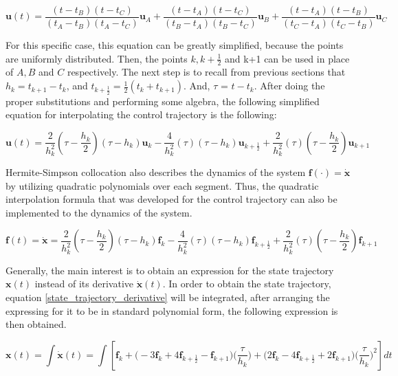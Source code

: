 \documentclass{thesisreport}
\begin{document}
\begin{equation}
\bm{u}(t) = \frac{(t-t_B)(t-t_C)}{(t_A-t_B)(t_A-t_C)}\bm{u}_A + 
\frac{(t-t_A)(t-t_C)}{(t_B-t_A)(t_B-t_C)}\bm{u}_B + 
\frac{(t-t_A)(t-t_B)}{(t_C-t_A)(t_C-t_B)}\bm{u}_C
\end{equation}

For this specific case, this equation can be greatly simplified, because the points are uniformly distributed.
Then, the points $k, k+\frac{1}{2}$ and k+1 can be used in place of $A,B$ and $C$ respectively. The next step is to recall from previous sections that $h_k = t_{k+1}-t_k$, and  $t_{k + \frac{1}{2}}=\frac{1}{2}(t_k + t_{k+1})$. And, $\tau$ = $t-t_k$. After doing the proper substitutions and performing some algebra, the following simplified equation for interpolating the control trajectory is the following:

\begin{equation}
	\bm{u}(t) = \frac{2}{h_k^2} (\tau - \frac{h_k}{2})(\tau - h_k)\bm{u}_k - \frac{4}{h_k^2}(\tau)(\tau - h_k)\bm{u}_{k+\frac{1}{2}} + \frac{2}{h_k^2}(\tau)(\tau-\frac{h_k}{2})\bm{u}_{k+1} 
\end{equation}

Hermite-Simpson collocation also describes the dynamics of the system $\bm{f}(\cdot)=\dot{\bm{x}}$ by utilizing quadratic polynomials over each segment. Thus, the quadratic interpolation formula that was developed for the control trajectory can also be implemented to the dynamics of the system.

\begin{equation}\label{state_trajectory_derivative}
	\bm{f}(t) = \dot{\bm{x}} = \frac{2}{h_k^2} (\tau - \frac{h_k}{2})(\tau - h_k)\bm{f}_k - \frac{4}{h_k^2}(\tau)(\tau - h_k)\bm{f}_{k+\frac{1}{2}} + \frac{2}{h_k^2}(\tau)(\tau-\frac{h_k}{2})\bm{f}_{k+1} 
\end{equation}

Generally, the main interest is to obtain an expression for the state trajectory $\bm{x}(t)$ instead of its derivative $\dot{\bm{x}}(t)$. In order to obtain the state trajectory, equation \ref{state_trajectory_derivative} will be integrated, after arranging the expressing for it to be in standard polynomial form, the following expression is then obtained.

\begin{equation}
	\bm{x}(t)=\int \dot{\bm{x}}(t)=\int \left[ \bm{f}_k + \bigg(-3 \bm{f}_k + 4 \bm{f}_{k + \frac{1}{2}} -\bm{f}_{k+1}\bigg) \bigg( \frac{\tau}{h_k}\bigg) + \bigg( 2 \bm{f}_k -4 \bm{f}_{k+ \frac{1}{2}} + 2 \bm{f}_{k+1}\bigg)\bigg(\frac{\tau}{h_k}\bigg)^2 \right]dt
\end{equation}
\end{document}
